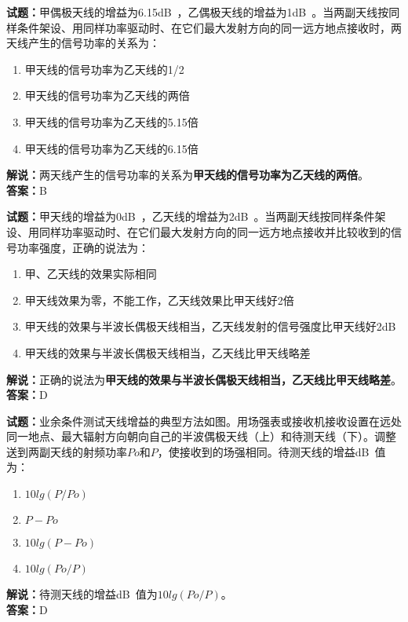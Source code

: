 \documentclass{ctexbook}
\begin{document}
\textbf{试题：}甲偶极天线的增益为6.15\unit[qualifier-mode=combine]{\deci\bel{}}，乙偶极天线的增益为1\unit[qualifier-mode=combine]{\deci\bel{}}。当两副天线按同样条件架设、用同样功率驱动时、在它们最大发射方向的同一远方地点接收时，两天线产生的信号功率的关系为：
\begin{enumerate}[leftmargin=3em]
  \item 甲天线的信号功率为乙天线的1/2
  \item 甲天线的信号功率为乙天线的两倍
  \item 甲天线的信号功率为乙天线的5.15倍
  \item 甲天线的信号功率为乙天线的6.15倍
\end{enumerate}
\noindent\textbf{解说：}两天线产生的信号功率的关系为\textbf{甲天线的信号功率为乙天线的两倍}。\\\noindent\textbf{答案：}B

\vspace{1em}

\textbf{试题：}甲天线的增益为0\unit[qualifier-mode=combine]{\deci\bel{}}，乙天线的增益为2\unit[qualifier-mode=combine]{\deci\bel{}}。当两副天线按同样条件架设、用同样功率驱动时、在它们最大发射方向的同一远方地点接收并比较收到的信号功率强度，正确的说法为：
\begin{enumerate}[leftmargin=3em]
  \item 甲、乙天线的效果实际相同
  \item 甲天线效果为零，不能工作，乙天线效果比甲天线好2倍%
  \item 甲天线的效果与半波长偶极天线相当，乙天线发射的信号强度比甲天线好2dB%
  \item 甲天线的效果与半波长偶极天线相当，乙天线比甲天线略差%
\end{enumerate}
\noindent\textbf{解说：}正确的说法为\textbf{甲天线的效果与半波长偶极天线相当，乙天线比甲天线略差}。\\\noindent\textbf{答案：}D

\vspace{1em}

\textbf{试题：}业余条件测试天线增益的典型方法如图。用场强表或接收机接收设置在远处同一地点、最大辐射方向朝向自己的半波偶极天线（上）和待测天线（下）。调整送到两副天线的射频功率\(Po\)和\(P\)，使接收到的场强相同。待测天线的增益\unit[qualifier-mode=combine]{\deci\bel{}}值为：
\begin{enumerate}[leftmargin=3em]
  \item \(10 lg(P/Po)\)
  \item \(P - Po\)
  \item \(10 lg(P-Po)\)
  \item \(10 lg(Po/P)\)
\end{enumerate}
\noindent\textbf{解说：}待测天线的增益\unit[qualifier-mode=combine]{\deci\bel{}}值为\(10 lg(Po/P)\)。\\
\noindent\textbf{答案：}D
\end{document}
